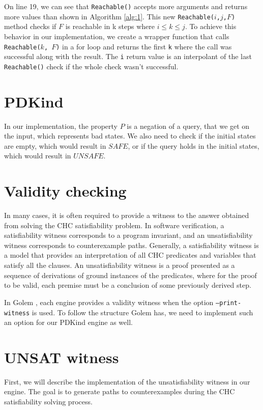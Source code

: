 On line 19, we can see that \texttt{Reachable()} accepts more arguments and
returns more values than shown in Algorithm
\ref{alg:1}. This new
\texttt{Reachable($i$,$j$,$F$)} method checks if $F$ is reachable in k steps
where $i\leq k \leq j$. To achieve this behavior in our implementation, we
create a wrapper function that calls \texttt{Reachable($k$, $F$)} in a for loop
and returns the first \texttt{k} where the call was successful along with the
result. The \texttt{i} return value is an interpolant of the last
\texttt{Reachable()} check if the whole check wasn't successful.

\section*{PDKind}
In our implementation, the property \( P \) is a negation of a query, that
we get on the input, which represents bad states. We also need to check if the
initial states are empty, which would result in \( SAFE \), or if the query
holds in the initial states, which would result in \( UNSAFE \).

\section{Validity checking}
\noindent In many cases, it is often required to provide a witness to the
answer obtained from solving the CHC satisfiability problem. In software
verification, a satisfiability witness corresponds to a program invariant, and
an unsatisfiability witness corresponds to counterexample paths. Generally, a
satisfiability witness is a model that provides an interpretation of all CHC
predicates and variables that satisfy all the clauses. An unsatisfiability
witness is a proof presented as a sequence of derivations of ground instances
of the predicates, where for the proof to be valid, each premise must be a
conclusion of some previously derived step.

In Golem \cite{blicha_golem_2023}, each engine provides a validity witness when
the option \texttt{--print-witness} is used. To follow the structure Golem has,
we need to implement such an option for our PDKind engine as well.

\section*{UNSAT witness} \label{UNSATWit}
\noindent First, we will describe the implementation of the unsatisfiability
witness in our engine. The goal is to generate paths to counterexamples during
the CHC satisfiability solving process.

